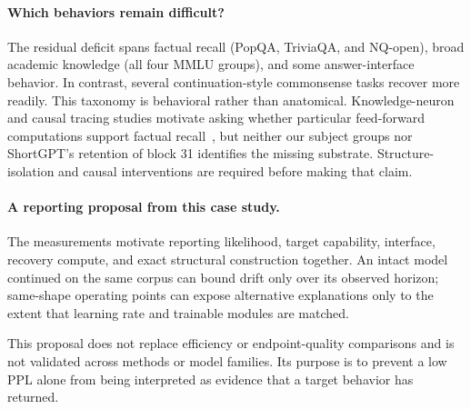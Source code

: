 \paragraph{Which behaviors remain difficult?}
The residual deficit spans factual recall (PopQA, TriviaQA, and NQ-open), broad
academic knowledge (all four MMLU groups), and some answer-interface behavior.
In contrast, several continuation-style commonsense tasks recover more readily.
This taxonomy is behavioral rather than anatomical. Knowledge-neuron and causal
tracing studies motivate asking whether particular feed-forward computations
support factual recall~\citep{dai2022knowledge,meng2022locating}, but neither our
subject groups nor ShortGPT's retention of block 31 identifies the missing
substrate. Structure-isolation and causal interventions are required before
making that claim.

\paragraph{A reporting proposal from this case study.}
The measurements motivate reporting likelihood, target capability, interface,
recovery compute, and exact structural construction together. An intact model
continued on the same corpus can bound drift only over its observed horizon;
same-shape operating points can expose alternative explanations only to the
extent that learning rate and trainable modules are matched.

\begin{center}
\end{center}

This proposal does not replace efficiency or endpoint-quality comparisons and
is not validated across methods or model families. Its purpose is to prevent a
low PPL alone from being interpreted as evidence that a target behavior has
returned.
